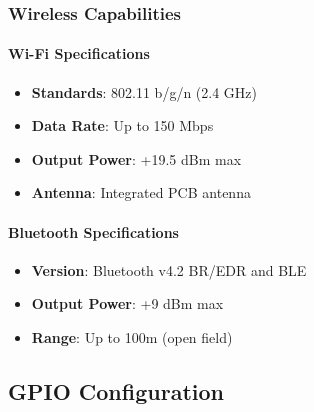 \documentclass[11pt,a4paper]{article}
\begin{document}
\subsubsection{Wireless Capabilities}

\paragraph{Wi-Fi Specifications}
\begin{itemize}
\item \textbf{Standards}: 802.11 b/g/n (2.4 GHz)
\item \textbf{Data Rate}: Up to 150 Mbps
\item \textbf{Output Power}: +19.5 dBm max
\item \textbf{Antenna}: Integrated PCB antenna
\end{itemize}

\paragraph{Bluetooth Specifications}
\begin{itemize}
\item \textbf{Version}: Bluetooth v4.2 BR/EDR and BLE
\item \textbf{Output Power}: +9 dBm max
\item \textbf{Range}: Up to 100m (open field)
\end{itemize}

\subsection{GPIO Configuration}
\end{document}

